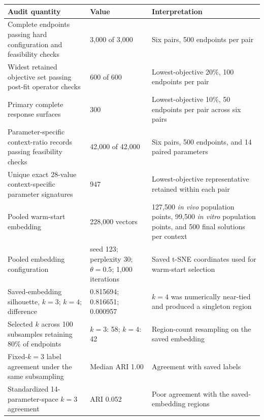 \begin{table}[!htbp]
\vspace{0.7em}
\begin{tabular}{@{}p{}p{}p{}@{}}
\toprule
Audit quantity & Value & Interpretation \\
\midrule
Complete endpoints passing hard configuration and feasibility checks & 3,000 of 3,000 & Six pairs, 500 endpoints per pair \\
Widest retained objective set passing post-fit operator checks & 600 of 600 & Lowest-objective 20\%, 100 endpoints per pair \\
Primary complete response surfaces & 300 & Lowest-objective 10\%, 50 endpoints per pair across six pairs \\
Parameter-specific context-ratio records passing feasibility checks & 42,000 of 42,000 & Six pairs, 500 endpoints, and 14 paired parameters \\
Unique exact 28-value context-specific parameter signatures & 947 & Lowest-objective representative retained within each pair \\
Pooled warm-start embedding & 228,000 vectors & 127,500 \textit{in vivo} population points, 99,500 \textit{in vitro} population points, and 500 final solutions per context \\
Pooled embedding configuration & seed 123; perplexity 30; $\theta=0.5$; 1,000 iterations & Saved t-SNE coordinates used for warm-start selection \\
Saved-embedding silhouette, $k=3$; $k=4$; difference & 0.815694; 0.816651; 0.000957 & $k=4$ was numerically near-tied and produced a singleton region \\
Selected $k$ across 100 subsamples retaining 80\% of endpoints & $k=3$: 58; $k=4$: 42 & Region-count resampling on the saved embedding \\
Fixed-$k=3$ label agreement under the same subsampling & Median ARI 1.00 & Agreement with saved labels \\
Standardized 14-parameter-space $k=3$ agreement & ARI 0.052 & Poor agreement with the saved-embedding regions \\
\bottomrule
\end{tabular}
\end{table}
